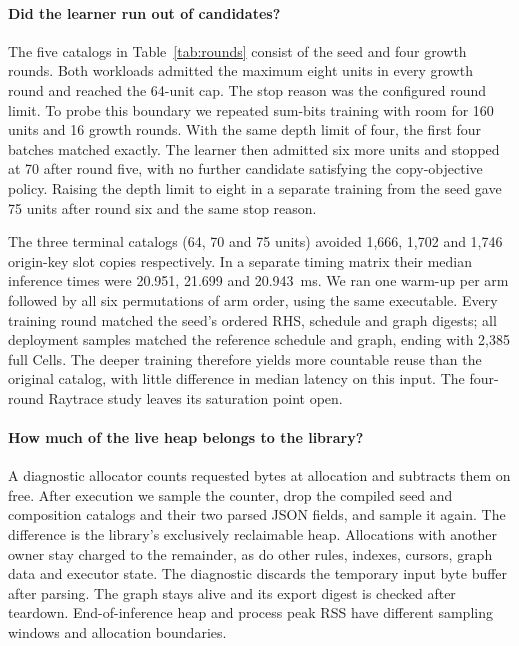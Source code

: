 \paragraph{Did the learner run out of candidates?}
The five catalogs in Table~\ref{tab:rounds} consist of the seed and four growth rounds. Both workloads admitted the maximum eight units in every growth round and reached the 64-unit cap. The stop reason was the configured round limit. To probe this boundary we repeated sum-bits training with room for 160 units and 16 growth rounds. With the same depth limit of four, the first four batches matched exactly. The learner then admitted six more units and stopped at 70 after round five, with no further candidate satisfying the copy-objective policy. Raising the depth limit to eight in a separate training from the seed gave 75 units after round six and the same stop reason.

The three terminal catalogs (64, 70 and 75 units) avoided 1,666, 1,702 and 1,746 origin-key slot copies respectively. In a separate timing matrix their median inference times were 20.951, 21.699 and 20.943~ms. We ran one warm-up per arm followed by all six permutations of arm order, using the same executable. Every training round matched the seed's ordered RHS, schedule and graph digests; all deployment samples matched the reference schedule and graph, ending with 2,385 full Cells. The deeper training therefore yields more countable reuse than the original catalog, with little difference in median latency on this input. The four-round Raytrace study leaves its saturation point open.

\paragraph{How much of the live heap belongs to the library?}
A diagnostic allocator counts requested bytes at allocation and subtracts them on free. After execution we sample the counter, drop the compiled seed and composition catalogs and their two parsed JSON fields, and sample it again. The difference is the library's exclusively reclaimable heap. Allocations with another owner stay charged to the remainder, as do other rules, indexes, cursors, graph data and executor state. The diagnostic discards the temporary input byte buffer after parsing. The graph stays alive and its export digest is checked after teardown. End-of-inference heap and process peak RSS have different sampling windows and allocation boundaries.

